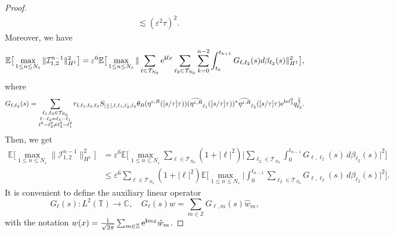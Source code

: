 \documentclass[a4paper]{amsart}
\begin{document}
\begin{proof}
\begin{align*}
    &\lesssim (\varepsilon^2 \tau)^{2}.
   \end{align*}
   Moreover, we have
   \begin{align*}
        \mathbb{E}\big[ \max_{1\le n\le N_\varepsilon}\|\mathcal{I}_{1,2}^{n-1} \|^2_{H^1}\big] = \varepsilon^6 \mathbb{E}\big[\max_{1\le n\le N_\varepsilon}\|\sum_{\ell\in\mathcal{T}_{N_0}} {\rm e}^{{\bf i}\ell x} \sum_{\ell_2\in\mathcal{T}_{N_0}}\sum_{k=0}^{n-2}\int_{t_k}^{t_{k+1}} G_{\ell,\ell_2}(s)d\beta_{\ell_2}(s)\|^2_{H^1}\big],
   \end{align*}
   where
   $$
   G_{\ell,\ell_2}(s)=\sum_{\substack{\ell_1,\ell_3\in\mathcal{T}_{N_0}\\ \ell-\ell_2=\ell_3-\ell_1\\ \ell^2-\ell_2^2\ne \ell_3^2-\ell_1^2}} r_{\ell,\ell_1,\ell_2,\ell_3}
   S_{[\frac{s}{\tau}],\ell,\ell_1,\ell_2,\ell_3} \theta_R(\eta^{\varepsilon,R}([s/\tau]\tau)) (\widehat{\eta^{\varepsilon,R}}_{\ell_1}([s/\tau]\tau))^* \widehat{\eta^{\varepsilon,R}}_{\ell_3}([s/\tau]\tau)
  {\rm e}^{{\bf i}s \ell_2^2}q_{\ell_2}^{\frac{1}{2}}.
   $$
   Then, we get
   \begin{align*}
       \mathbb{E}\big[\max_{1\le n\le N_\varepsilon} \|\mathcal{I}_{1,2}^{n-1} \|^2_{H^1}\big] &= \varepsilon^6 \mathbb{E}\big[\max_{1\le n\le N_\varepsilon}\sum_{\ell\in\mathcal{T}_{N_0}} (1+|\ell|^2)\big|\sum_{\ell_2\in\mathcal{T}_{N_0}}\int_0^{t_{n-1}} G_{\ell,\ell_2}(s)\,d\beta_{\ell_2}(s) \big|^2\big]\\
       &\le \varepsilon^6 \sum_{\ell\in\mathcal{T}_{N_0}} (1+|\ell|^2)\mathbb{E}\big[\max_{1\le n\le N_\varepsilon}\big|\int_0^{t_{n-1}}  \sum_{\ell_2\in\mathcal{T}_{N_0}}G_{\ell,\ell_2}(s)\,d\beta_{\ell_2}(s) \big|^2\big].
   \end{align*}
   It is convenient to define the auxiliary linear operator
   $$
   G_{\ell}(s):L^2(\mathbb{T})\to\mathbb{C}, \quad G_{\ell}(s)w = \sum_{m\in\mathbb{Z}} G_{\ell,m}(s)\hat{w}_{m},
   $$
   with the notation $w(x)=\frac{1}{\sqrt{2\pi}}\sum_{m\in\mathbb{Z}} {\rm e}^{{\bf i}m x} \hat{w}_m$. 

\end{proof}
\end{document}
